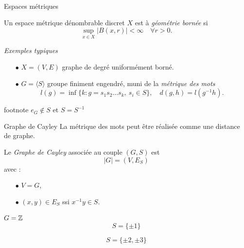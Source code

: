 \begin{frame}{Espaces m\'etriques}
\begin{definition}
Un espace m\'etrique d\'enombrable discret  $X$ est \`a \textit{g\'eom\'etrie born\'ee} si
\[\sup_{x\in X} | B(x,r)| < \infty \quad \forall r >0.\]
\end{definition}
\textit{Exemples typiques}\\
\vfill
\begin{itemize}
\item[$\bullet$] $X=(V,E)$ graphe de degr\'e uniform\'ement born\'e.
\vfill
\item[$\bullet$] $G=\langle S \rangle$ groupe finiment engendr\'e, muni de la \textit{m\'etrique des mots}\\
\[l(g) = \inf\{k : g = s_1 s_2 ... s_k , \ s_i \in S\}, \quad d(g,h) = l(g^{-1}h).\]
\end{itemize}
\vfill
footnote  $e_G\notin S$ et $S=S^{-1}$
\end{frame}

\begin{frame}{Graphe de Cayley}
La m\'etrique des mots peut \^{e}tre r\'ealis\'ee comme une distance de graphe.\\
\vfill
\begin{definition}
Le \textit{Graphe de Cayley} associ\'ee au couple $(G,S)$ est 
\[|G| = (V,E_S)\]
avec : 
\vfill
\begin{itemize}
\item[$\bullet$] $V=G$,
\vfill
\item[$\bullet$] $(x,y)\in E_S$ ssi $x^{-1}y\in S$.
\end{itemize}
\end{definition}
\vfill
\end{frame}

\begin{frame}{$G=\mathbb Z$}
\[S= \{\pm 1\}\]
\[S= \{\pm 2 , \pm 3\}\]
\end{frame}

